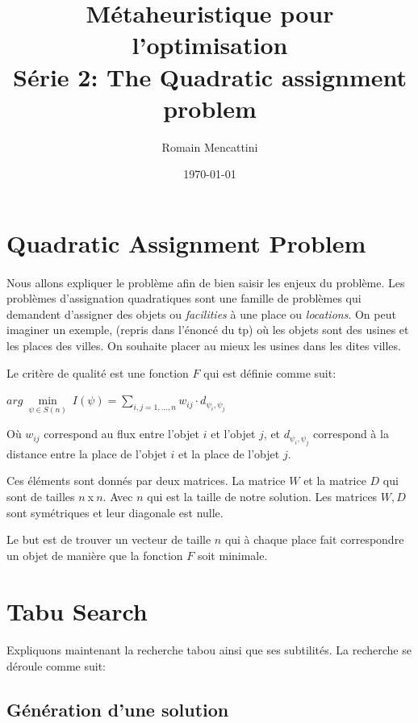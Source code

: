 \documentclass[a4paper, 11pt]{article}
\title{\textbf{Métaheuristique pour l'optimisation}\\Série 2: The Quadratic assignment problem}
\author{Romain Mencattini}
\date{\today}
\begin{document}
\maketitle
\newpage
\tableofcontents
\newpage

\section{Quadratic Assignment Problem}
\paragraph{}
Nous allons expliquer le problème afin de bien saisir les enjeux du problème.
Les problèmes d'assignation quadratiques sont une famille de problèmes qui demandent d'assigner des objets ou \textit{facilities} à 
une place ou \textit{locations}.
On peut imaginer un exemple, (repris dans l'énoncé du tp) où les objets sont des usines et les places des villes. On souhaite placer au
mieux les usines dans les dites villes.

Le critère de qualité est une fonction $F$ qui est définie comme suit:
\begin{center}
 $arg \ \min\limits_{\psi \in S(n)} \ I(\psi) = \sum\limits_{i,j=1,...,n} w_{ij} \cdot d_{\psi_i,\psi_j}$
\end{center}

Où $w_{ij}$ correspond au flux entre l'objet $i$ et l'objet $j$, et $d_{\psi_i,\psi_j}$ correspond à la distance entre la place de 
l'objet $i$ et la place de l'objet $j$.

Ces éléments sont donnés par deux matrices. La matrice $W$ et la matrice $D$ qui sont de tailles $n\ $x$\ n$. Avec $n$ qui est la taille de 
notre solution. Les matrices $W,D$ sont symétriques et leur diagonale est nulle.

Le but est de trouver un vecteur de taille $n$ qui à chaque place fait correspondre un objet de manière que la fonction $F$ soit minimale.

\section{Tabu Search}
\paragraph{}Expliquons maintenant la recherche tabou ainsi que ses subtilités.
La recherche se déroule comme suit:

\subsection{Génération d'une solution}
\end{document}
